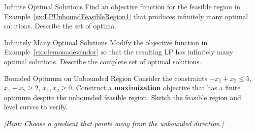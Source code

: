 \begin{ex}{Infinite Optimal Solutions}{}
Find an objective function for the feasible region in Example~\ref{ex:LPUnboundFeasibleRegion1} that produces infinitely many optimal solutions. Describe the set of optima.
\exrefs{\S\ref{sec:infinitely-many-optima}}
\end{ex}

\begin{ex}{Infinitely Many Optimal Solutions}{}
Modify the objective function in Example~\ref{exa:lemonadevendor} so that the resulting LP has infinitely many optimal solutions. Describe the complete set of optimal solutions.
\end{ex}

\begin{ex}{Bounded Optimum on Unbounded Region}{}
Consider the constraints $-x_1+x_2\leq 5$, $x_1+x_2\geq 2$, $x_1,x_2\geq 0$. Construct a \textbf{maximization} objective that has a finite optimum despite the unbounded feasible region. Sketch the feasible region and level curves to verify.

\emph{[Hint: Choose a gradient that points away from the unbounded direction.]}
\end{ex}


